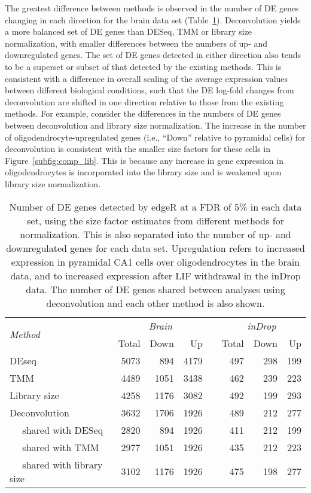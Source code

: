 \documentclass{article}
\begin{document}
The greatest difference between methods is observed in the number of DE genes changing in each direction for the brain data set (Table~\ref{tab:real_de}).
Deconvolution yields a more balanced set of DE genes than DESeq, TMM or library size normalization, with smaller differences between the numbers of up- and downregulated genes.
The set of DE genes detected in either direction also tends to be a superset or subset of that detected by the existing methods.
This is consistent with a difference in overall scaling of the average expression values between different biological conditions, 
    such that the DE log-fold changes from deconvolution are shifted in one direction relative to those from the existing methods.
For example, consider the differences in the numbers of DE genes between deconvolution and library size normalization.
The increase in the number of oligodendrocyte-upregulated genes (i.e., ``Down'' relative to pyramidal cells) for deconvolution is consistent with the smaller size factors for these cells in Figure~\ref{subfig:comp_lib}.
This is because any increase in gene expression in oligodendrocytes is incorporated into the library size and is weakened upon library size normalization.

\begin{table}[bt]
\caption{
    Number of DE genes detected by edgeR at a FDR of 5\% in each data set, using the size factor estimates from different methods for normalization.
    This is also separated into the number of up- and downregulated genes for each data set.
    Upregulation refers to increased expression in pyramidal CA1 cells over oligodendrocytes in the brain data, and to increased expression after LIF withdrawal in the inDrop data.
    The number of DE genes shared between analyses using deconvolution and each other method is also shown.
}
\begin{center}
\begin{tabular}{l r r r c r r r}
\hline
\multirow{2}{*}{\textit{Method}} & \multicolumn{3}{c}{\textit{Brain}} && \multicolumn{3}{c}{\textit{inDrop}}  \\
\cline{2-4}
\cline{6-8}
& Total & Down & Up && Total & Down & Up \\
\hline
DEseq                               & 5073 & 894  & 4179 && 497 & 298 & 199 \\
TMM                                 & 4489 & 1051 & 3438 && 462 & 239 & 223 \\
Library size                        & 4258 & 1176 & 3082 && 492 & 199 & 293 \\
Deconvolution                       & 3632 & 1706 & 1926 && 489 & 212 & 277 \\
$\quad$ shared with DESeq           & 2820 & 894  & 1926 && 411 & 212 & 199 \\
$\quad$ shared with TMM             & 2977 & 1051 & 1926 && 435 & 212 & 223 \\
$\quad$ shared with library size    & 3102 & 1176 & 1926 && 475 & 198 & 277 \\
\hline                                                   
\end{tabular}
\end{center}
\label{tab:real_de}
\end{table}
\end{document}
